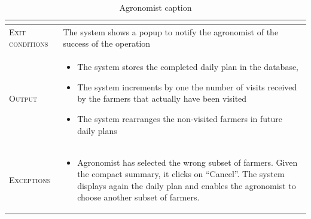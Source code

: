 \begin{table}[H]
\begin{tabular}[c]{|l|p{}|}
\begin{itemize}
                                        \end{itemize}\\
        \hline %
        \textsc{Exit conditions}    &  The system shows a popup to notify the agronomist of the success of the operation
        \\
    	\hline %
    	\textsc{Output}             &  \begin{itemize}
    	    \item The system stores the completed daily plan in the database, 
            \item The system increments by one the number of visits received by the farmers that actually have been visited
            \item The system rearranges the non-visited farmers in future daily plans

    	\end{itemize}\\
    	\hline %
    	\textsc{Exceptions}         &  \begin{itemize}
    	    \item Agronomist has selected the wrong subset of farmers. Given the compact summary, it clicks on “Cancel”. The system displays again the daily plan and enables the agronomist to choose another subset of farmers.
    	\end{itemize}\\
    	
    	\hline %
        
    \end{tabular}
    \caption{\label{tab:confirm_deviations_section}Agronomist caption }
\end{table}

